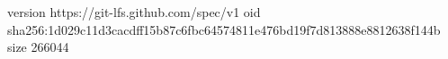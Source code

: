 version https://git-lfs.github.com/spec/v1
oid sha256:1d029c11d3cacdff15b87c6fbc64574811e476bd19f7d813888e8812638f144b
size 266044

